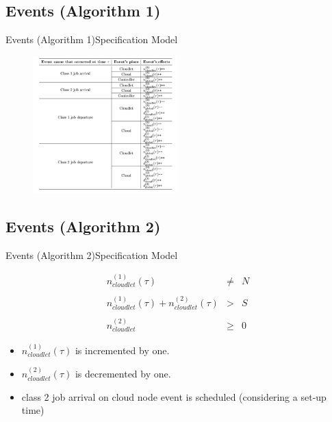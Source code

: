 \documentclass[10pt]{beamer}
\begin{document}
\subsection{Events (Algorithm 1)}
\begin{frame}[fragile]{Events (Algorithm 1)}{Specification Model}

\begin{figure}
\centering
\includegraphics[width=\textwidth, height=200px]{./images/EventsSpec.png}
\label{fig:Concorrente}
\end{figure}

\end{frame}

\subsection{Events (Algorithm 2)}
\begin{frame}[fragile]{Events (Algorithm 2)}{Specification Model}

\begin{equation}
\begin{array} {rcl} 

n_{cloudlet}^{(1)}(\tau) & \neq & N \\\\

n_{cloudlet}^{(1)}(\tau) + n_{cloudlet}^{(2)}(\tau) & > & S \\\\

n_{cloudlet}^{(2)} & \geqslant & 0

\end{array}
\end{equation}

\begin{itemize}
\item $n_{cloudlet}^{(1)}(\tau)$ is incremented by one.
\item $n_{cloudlet}^{(2)}(\tau)$ is decremented by one.
\item class 2 job arrival on cloud node event is scheduled (considering a set-up time)
\end{itemize}


\end{frame}
\end{document}
